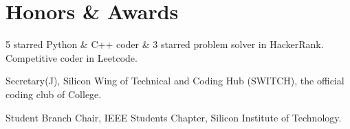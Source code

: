 \documentclass[]{deedy-resume-openfont}
\begin{document}
\section{Honors \& Awards}
\begin{tightemize}
\item 5 starred Python \& C++ coder \& 3 starred problem solver in HackerRank. Competitive coder in Leetcode.\\
\item Secretary(J), Silicon Wing of Technical and Coding Hub (SWITCH), the official coding club of College.\\
\item Student Branch Chair, IEEE Students\textquotesingle{} Chapter, Silicon Institute of Technology.\\
\end{tightemize}
     \ 
     
\end{document}
